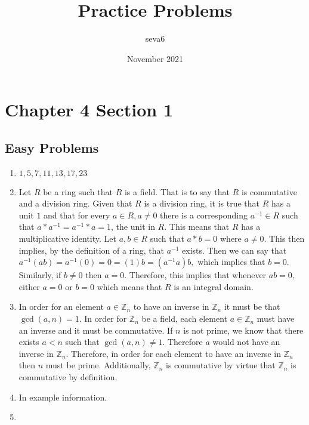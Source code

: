 \documentclass[11pt]{article}
\title{Practice Problems}
\author{seva6 }
\date{November 2021}
\newcommand{\Z}{\mathbb{Z}}
\begin{document}
\maketitle

\section{Chapter 4 Section 1}

\subsection{Easy Problems}

\begin{enumerate}
    \item 
    
    $1, 5, 7, 11, 13, 17, 23$
    
    \item
    
    Let $R$ be a ring such that $R$ is a field. That is to say that $R$ is commutative and a division ring. Given that $R$ is a division ring, it is true that $R$ has a unit $1$ and that for every $a\in R, a\neq 0$ there is a corresponding $a^{-1}\in R$ such that $a*a^{-1}=a^{-1}*a=1$, the unit in $R$. This means that $R$ has a multiplicative identity. Let $a,b\in R$ such that $a*b=0$ where $a\neq 0.$ This then implies, by the definition of a ring, that $a^{-1}$ exists. Then we can say that $a^{-1}(ab)=a^{-1}(0)=0=(1)b=(a^{-1}a)b,$ which implies that $b=0.$ Similarly, if $b\neq 0$ then $a=0.$ Therefore, this implies that whenever $ab=0,$ either $a=0$ or $b=0$ which means that $R$ is an integral domain.
    
    \item
    
    In order for an element $a\in \Z_n$ to have an inverse in $\Z_n$ it must be that $\gcd(a,n)=1$. In order for $\Z_n$ be a field, each element $a\in \Z_n$ must have an inverse and it must be commutative. If $n$ is not prime, we know that there exists $a<n$ such that $\gcd(a,n)\neq 1$. Therefore $a$ would not have an inverse in $\Z_n$. Therefore, in order for each element to have an inverse in $\Z_n$ then $n$ must be prime. Additionally, $\Z_n$ is commutative by virtue that $\Z_n$ is commutative by definition.
    
    \item
    
    In example information.
    
    \item
    

\end{enumerate}
\end{document}
